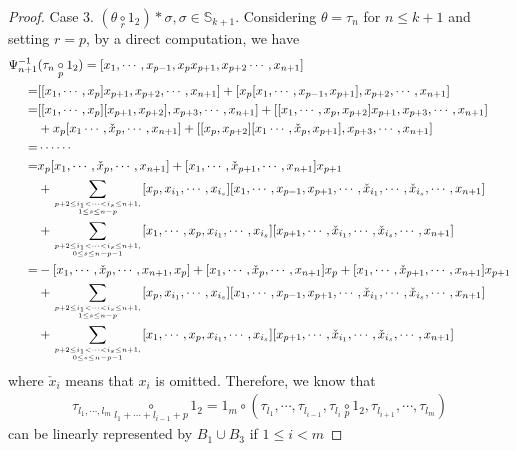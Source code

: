 \documentclass{amsart}
\theoremstyle{definition}
\theoremstyle{remark}
\numberwithin{equation}{section}
\def\S{\mathbb{S}}
\newcommand{\ucr}[1]{\underset{#1}{\circ}}
\def \S{\mathbb{S}}
\begin{document}
\begin{proof}
Case 3. $(\theta\ucr{r}  1_2)\ast \sigma, \sigma\in \S_{k+1}$. 
Considering $\theta=\tau_n$ for $n\leq k+1$ and setting 
$r=p$, by a direct computation, we have 
\begin{align*}
	\Psi_{n+1}^{-1}&(\tau_n\ucr{p} 1_2)=[x_1, \cdots, 
	x_{p-1}, x_px_{p+1}, x_{p+2} \cdots, x_{n+1}] \\  
	=&[[x_1,\cdots, x_p]x_{p+1},x_{p+2},\cdots,x_{n+1}]
	+[x_p[x_1,\cdots,x_{p-1},x_{p+1}],x_{p+2},\cdots, x_{n+1}]
	\\
	=&[[x_1,\cdots,x_p][x_{p+1},x_{p+2}],x_{p+3},\cdots,x_{n+1}]
	+ [[x_1,\cdots,x_p,x_{p+2}]x_{p+1},x_{p+3},\cdots, x_{n+1}] 
	  \\
	 &+x_p[x_1\cdots, \check{x}_p, \cdots, x_{n+1}]
	+[[x_p, x_{p+2}][x_1\cdots, \check{x}_p, x_{p+1}], x_{p+3},\cdots,x_{n+1}]\\
	 =&\cdots\cdots\\
	=& x_p[x_1, \cdots, \check{x}_p, \cdots, x_{n+1}]
	+[x_1, \cdots,\check{x}_{p+1}, \cdots, x_{n+1}]x_{p+1}\\
	&+\sum_{p+2\le i_1<\cdots<i_s\le n+1,\atop 1\le s\le n-p }[x_p, x_{i_1}, 
	\cdots, x_{i_s}][x_1, \cdots,x_{p-1}, x_{p+1}, \cdots,  
	\check{x}_{i_1}, \cdots, \check{x}_{i_s}, \cdots, x_{n+1}]\\
	&+\sum_{p+2\le i_1<\cdots<i_s\le n+1,\atop 0\le s\le n-p-1}[x_1, \cdots, 
	x_p, x_{i_1}, \cdots, x_{i_s}][x_{p+1}, \cdots,  
	\check{x}_{i_1}, \cdots, \check{x}_{i_s}, \cdots, x_{n+1}]\\
	=& -[x_1, \cdots, \check{x}_p, \cdots, x_{n+1}, x_p]
	+[x_1, \cdots, \check{x}_p, \cdots, x_{n+1}]x_p
	+[x_1, \cdots, \check{x}_{p+1}, \cdots, x_{n+1}]x_{p+1}\\
	&+\sum_{p+2\le i_1<\cdots<i_s\le n+1,\atop 1\le s\le n-p }[x_p, x_{i_1}, 
	\cdots, x_{i_s}][x_1, \cdots,x_{p-1}, x_{p+1}, \cdots,  
	\check{x}_{i_1}, \cdots, \check{x}_{i_s}, \cdots, x_{n+1}]\\
	&+\sum_{p+2\le i_1<\cdots<i_s\le n+1,\atop 0\le s\le n-p-1}[x_1, \cdots, 
	x_p, x_{i_1}, \cdots, x_{i_s}][x_{p+1}, \cdots,  
	\check{x}_{i_1}, \cdots, \check{x}_{i_s}, \cdots, x_{n+1}]
\end{align*}
where $\check{x}_i$ means that $x_i$ is omitted. Therefore,  
 we know that
\begin{align*}
\tau_{l_1, \cdots, l_m}\ucr{l_1+\cdots+l_{i-1}+p}1_2
=1_m\circ (\tau_{l_1}, \cdots, \tau_{l_{i-1}}, 
\tau_{l_i}\ucr{p} 1_2, \tau_{l_{i+1}}, \cdots, \tau_{l_m})
\end{align*}
can be linearly represented by $B_1\cup B_3$ if $1\le i< m$ 

\end{proof}
\end{document}
